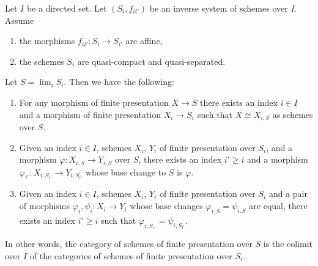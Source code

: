 %
\begin{lemma}
\label{lemma-descend-finite-presentation}
Let $I$ be a directed set.
Let $(S_i, f_{ii'})$ be an inverse system of schemes over $I$.
Assume
\begin{enumerate}
\item the morphisms $f_{ii'} : S_i \to S_{i'}$ are affine,
\item the schemes $S_i$ are quasi-compact and quasi-separated.
\end{enumerate}
Let $S = \lim_i S_i$. Then we have the following:
\begin{enumerate}
\item For any morphism of finite presentation $X \to S$
there exists an index $i \in I$ and a morphism of finite
presentation $X_i \to S_i$ such that $X \cong X_{i, S}$ as
schemes over $S$.
\item Given an index $i \in I$, schemes
$X_i$, $Y_i$ of finite presentation over $S_i$, and a morphism
$\varphi : X_{i, S} \to Y_{i, S}$ over $S$, there exists an index
$i' \geq i$ and a morphism
$\varphi_{i'} : X_{i, S_{i'}} \to Y_{i, S_{i'}}$
whose base change to $S$ is $\varphi$.
\item Given an index $i \in I$, schemes $X_i$, $Y_i$ of finite presentation
over $S_i$ and a pair of morphisms $\varphi_i, \psi_i : X_i \to Y_i$
whose base changes $\varphi_{i, S} = \psi_{i, S}$ are equal,
there exists an index $i' \geq i$ such that
$\varphi_{i, S_{i'}} = \psi_{i, S_{i'}}$.
\end{enumerate}
In other words, the category of schemes of finite presentation over
$S$ is the colimit over $I$ of the categories of schemes of finite
presentation over $S_i$.
\end{lemma}


